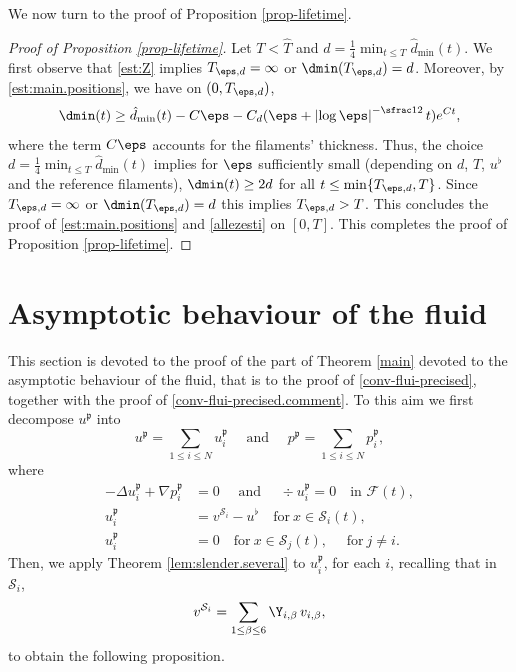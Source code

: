 We now turn to the proof of Proposition \ref{prop-lifetime}.

\begin{proof}[Proof of Proposition \ref{prop-lifetime}]
Let $T < \hat T$
and $d = \frac 1 4 \min_{t \leq T} \hat d_{\min}(t)$.
We first observe that \eqref{est:Z} implies $T_{\eps,d} = \infty$ or $\dmin(T_{\eps,d}) = d$.
Moreover, by \eqref{est:main.positions},
we have on $(0,T_{\eps,d})$,%
\begin{equation} \label{est:d_min}
\dmin(t) \geq \hat d_{\min}(t) - C \eps - C_d(\eps +\left|\log \eps\right|^{- \sfrac 1 2} t) e^{C t},
\end{equation}
where the term $C \eps$ accounts for the filaments' thickness.
Thus, the choice $ d = \frac 1 4 \min_{t \leq T} \hat d_{\min}(t)$ implies for $\eps$ sufficiently small (depending on $d$, $T$, $u^\flat$ and the reference filaments), $\dmin(t) \geq 2 d$ for all
$t \leq \min\{T_{\eps,d}, T\}$. Since $T_{\eps,d} = \infty$ or $\dmin(T_{\eps,d}) = d$ this implies $T_{\eps,d} > T$. This concludes the proof of \eqref{est:main.positions} and \eqref{allezesti} on $[0,T]$.
This completes the proof of
Proposition \ref{prop-lifetime}.
\end{proof}

\section{Asymptotic behaviour of the fluid}
\label{sectiondassaut}
This section is devoted to the proof of the part of Theorem \ref{main} devoted to the asymptotic behaviour of the fluid, that is to the proof of \eqref{conv-flui-precised}, together with the proof of \eqref{conv-flui-precised.comment}.
To this aim we first decompose
$u^\mathfrak{p} $
into
\begin{equation}
\label{trf}
u^\mathfrak{p} = \sum_{1 \leq i \leq N} u^\mathfrak{p} _i
\quad
\text{ and } \quad
p^\mathfrak{p} = \sum_{1 \leq i \leq N} p^\mathfrak{p} _i,
\end{equation}
where
\begin{subequations}
\label{fintrau-tot}
\begin{align}
\label{fintrau1}
- \Delta u^\mathfrak{p}_i + \nabla p^\mathfrak{p}_i &=0 \quad \text{ and } \quad \div u^\mathfrak{p}_i = 0 \quad \text{in }\mathcal{F}(t), \\
\label{fintrau1bis}
u^\mathfrak{p}_i &= v^{{\mathcal S}_i} - u^\flat \quad \text{for}\ x\in \mathcal{S}_i (t), \\
\label{fintrau1bisbis}
u^\mathfrak{p}_i &= 0 \quad \text{for}\ x\in \mathcal{S}_j (t), \quad \text{ for} ~ j \neq i.
\end{align}
\end{subequations}
Then, we apply Theorem \ref{lem:slender.several} to $ u^\mathfrak{p}_i $, for each $i$, recalling that in $ \mathcal{S}_i$,
\begin{equation*}
v^{{\mathcal S}_i} = \sum_{1\leq \beta \leq 6} \Y_{i,\beta }\, v_{i,\beta},
\end{equation*}
to obtain the following proposition.


